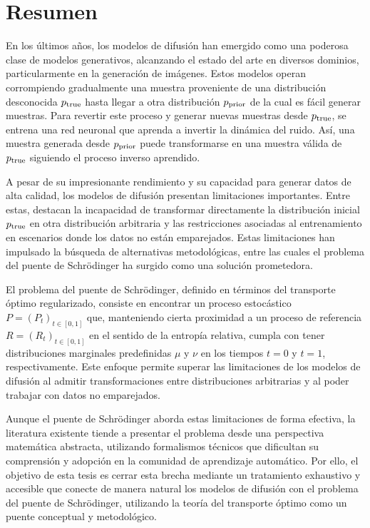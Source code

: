 \chapter*{Resumen}

En los últimos años, los modelos de difusión han emergido como una poderosa clase de modelos generativos, alcanzando el estado del arte en diversos dominios, particularmente en la generación de imágenes. Estos modelos operan corrompiendo gradualmente una muestra proveniente de una distribución desconocida $p_{\operatorname{true}}$ hasta llegar a otra distribución $p_{\operatorname{prior}}$ de la cual es fácil generar muestras. Para revertir este proceso y generar nuevas muestras desde $p_{\operatorname{true}}$, se entrena una red neuronal que aprenda a invertir la dinámica del ruido. Así, una muestra generada desde $p_{\operatorname{prior}}$ puede transformarse en una muestra válida de $p_{\operatorname{true}}$ siguiendo el proceso inverso aprendido.

A pesar de su impresionante rendimiento y su capacidad para generar datos de alta calidad, los modelos de difusión presentan limitaciones importantes. Entre estas, destacan la incapacidad de transformar directamente la distribución inicial $p_{\operatorname{true}}$ en otra distribución arbitraria y las restricciones asociadas al entrenamiento en escenarios donde los datos no están emparejados. Estas limitaciones han impulsado la búsqueda de alternativas metodológicas, entre las cuales el problema del puente de Schrödinger ha surgido como una solución prometedora.

El problema del puente de Schrödinger, definido en términos del transporte óptimo regularizado, consiste en encontrar un proceso estocástico $P = (P_t)_{t \in [0,1]}$ que, manteniendo cierta proximidad a un proceso de referencia $R = (R_t)_{t \in [0,1]}$ en el sentido de la entropía relativa, cumpla con tener distribuciones marginales predefinidas $\mu$ y $\nu$ en los tiempos $t=0$ y $t=1$, respectivamente. Este enfoque permite superar las limitaciones de los modelos de difusión al admitir transformaciones entre distribuciones arbitrarias y al poder trabajar con datos no emparejados.

Aunque el puente de Schrödinger aborda estas limitaciones de forma efectiva, la literatura existente tiende a presentar el problema desde una perspectiva matemática abstracta, utilizando formalismos técnicos que dificultan su comprensión y adopción en la comunidad de aprendizaje automático. Por ello, el objetivo de esta tesis es cerrar esta brecha mediante un tratamiento exhaustivo y accesible que conecte de manera natural los modelos de difusión con el problema del puente de Schrödinger, utilizando la teoría del transporte óptimo como un puente conceptual y metodológico.

